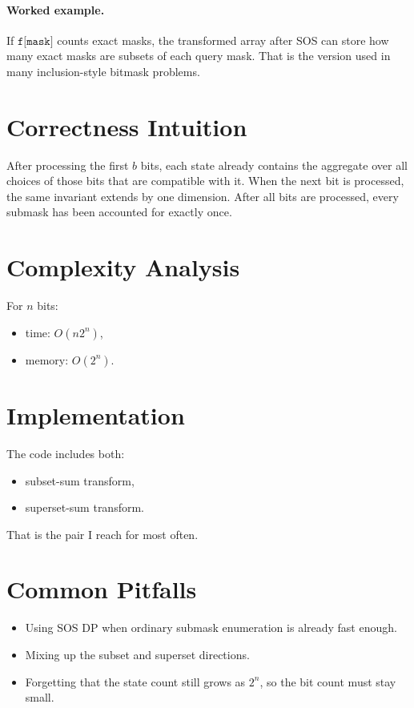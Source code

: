 \paragraph{Worked example.}
If \(\texttt{f[mask]}\) counts exact masks, the transformed array after SOS can store how many exact masks are subsets
of each query mask. That is the version used in many inclusion-style bitmask problems.

\section*{Correctness Intuition}

After processing the first \(b\) bits, each state already contains the aggregate over all choices of those bits that are
compatible with it. When the next bit is processed, the same invariant extends by one dimension. After all bits are
processed, every submask has been accounted for exactly once.

\section*{Complexity Analysis}

For \(n\) bits:
\begin{itemize}
  \item time: \(O(n 2^n)\),
  \item memory: \(O(2^n)\).
\end{itemize}

\section*{Implementation}

The code includes both:

\begin{itemize}
  \item subset-sum transform,
  \item superset-sum transform.
\end{itemize}

That is the pair I reach for most often.

\section*{Common Pitfalls}

\begin{itemize}
  \item Using SOS DP when ordinary submask enumeration is already fast enough.
  \item Mixing up the subset and superset directions.
  \item Forgetting that the state count still grows as \(2^n\), so the bit count must stay small.
\end{itemize}

